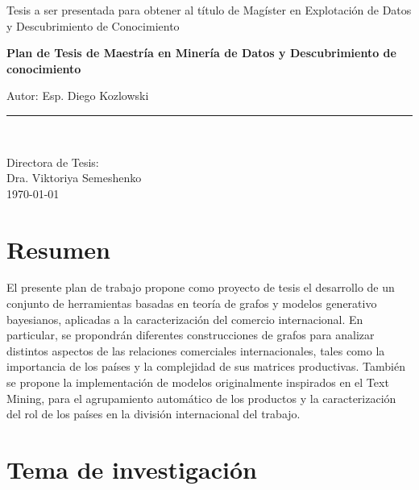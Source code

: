 \documentclass[runningheads,a4paper]{llncs}
\begin{document}
\begin{titlepage}
\begin{center}
\begin{large}
Tesis a ser presentada para obtener al título de Magíster en Explotación de Datos y Descubrimiento de Conocimiento\\	
\end{large}
\vspace*{0.2in}
\begin{Large}
\textbf{Plan de Tesis de Maestría en Minería de Datos y Descubrimiento de conocimiento} \\
\end{Large}
\vspace*{0.25in}
\begin{large}
Autor: Esp. Diego Kozlowski\\
\end{large}
\vspace*{0.3in}
\rule{80mm}{0.1mm}\\
\vspace*{0.1in}
\begin{large}
Directora de Tesis: \\
Dra. Viktoriya Semeshenko \\
\today
\end{large}
\end{center}

\end{titlepage}

\tableofcontents

\section{Resumen}

El presente plan de trabajo propone como proyecto de tesis el desarrollo de un conjunto de herramientas basadas en teoría de grafos y modelos generativo bayesianos, aplicadas a la caracterización del comercio internacional. En particular, se propondrán diferentes construcciones de grafos para analizar distintos aspectos de las relaciones comerciales internacionales, tales como la importancia de los países y la complejidad de sus matrices productivas. También se propone la implementación de modelos originalmente inspirados en el Text Mining, para el agrupamiento automático de los productos y la caracterización del rol de los países en la división internacional del trabajo.

\section[Tema]{Tema de investigación}
\end{document}
